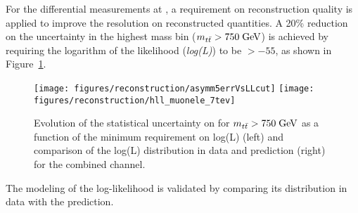 For the differential measurements at \seventev{}, a
requirement on reconstruction quality is applied to improve the
resolution on reconstructed quantities.
A 20\% reduction on the \ac{} uncertainty in the highest mass bin
($m_{t\bar{t}}{}>750\; \mathrm{GeV}{}$) is achieved by requiring the logarithm of the
likelihood ({\it log(L)}) to be $>-55$, as shown in Figure~\ref{fig:errvsllcut}.
\begin{figure}[!htb]\centering
  \texttt{[image: figures/reconstruction/asymm5errVsLLcut]}
  \texttt{[image: figures/reconstruction/hll\_muonele\_7tev]}
  \caption{
    \label{fig:errvsllcut}
    Evolution of the statistical uncertainty on \ac{} for
    $m_{t\bar{t}}{}>750\; \mathrm{GeV}{}$ as a function of the minimum requirement on
    log(L) (left) and comparison of the log(L) distribution in data
    and prediction (right) for the combined \ljets{} channel.
  }
\end{figure}
The modeling of the log-likelihood is validated by comparing its
distribution in data with the prediction.


